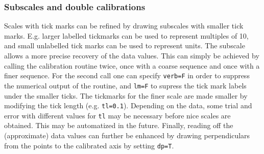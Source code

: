 \documentclass[a4paper]{article}
\begin{document}
\subsubsection*{Subscales and double calibrations}

Scales with tick marks can be refined by drawing subscales with smaller tick marks. 
E.g. larger labelled
tickmarks can be used to represent multiples of 10, and small unlabelled tick marks can be used to 
represent units. The subscale allows a more precise recovery of the data values. This can simply be 
achieved by calling the calibration routine twice, once with a coarse sequence and once with a finer 
sequence. For the second call one can specify {\tt verb=F} in order to suppress the numerical output
of the routine, and {\tt lm=F} to supress the tick mark labels under the smaller ticks. The tickmarks
for the finer scale are made smaller by modifying the tick length (e.g. {\tt tl=0.1}). Depending on the data, 
some trial and error with different values for {\tt tl} may be necessary before nice scales are obtained. This
may be automatized in the future. Finally, reading off the (approximate) data values can further be enhanced 
by drawing perpendiculars from the points to the calibrated axis by setting {\tt dp=T}.
\end{document}
